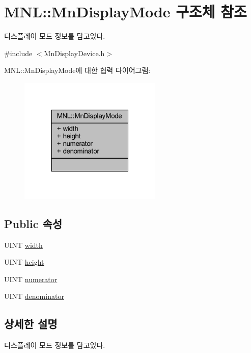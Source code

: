 \hypertarget{struct_m_n_l_1_1_mn_display_mode}{}\section{M\+NL\+:\+:Mn\+Display\+Mode 구조체 참조}
\label{struct_m_n_l_1_1_mn_display_mode}


디스플레이 모드 정보를 담고있다.  




{\ttfamily \#include $<$Mn\+Display\+Device.\+h$>$}



M\+NL\+:\+:Mn\+Display\+Mode에 대한 협력 다이어그램\+:\nopagebreak
\begin{figure}[H]
\begin{center}
\leavevmode
\includegraphics[width=193pt]{struct_m_n_l_1_1_mn_display_mode__coll__graph}
\end{center}
\end{figure}
\subsection*{Public 속성}
\begin{DoxyCompactItemize}
\item 
U\+I\+NT \hyperlink{struct_m_n_l_1_1_mn_display_mode_a483b98018ae07b10bfbf3c42d234550e}{width}
\item 
U\+I\+NT \hyperlink{struct_m_n_l_1_1_mn_display_mode_acc4e550e9b762236a0eae7298128bf06}{height}
\item 
U\+I\+NT \hyperlink{struct_m_n_l_1_1_mn_display_mode_a4049edd40bf11c67c6d85709ec4450ee}{numerator}
\item 
U\+I\+NT \hyperlink{struct_m_n_l_1_1_mn_display_mode_af891810b084193ba0f48557a747d04ab}{denominator}
\end{DoxyCompactItemize}


\subsection{상세한 설명}
디스플레이 모드 정보를 담고있다. 

